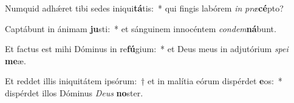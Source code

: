 \item Numquid adhǽret tibi sedes iniqui\textbf{tá}tis:~* qui fingis labórem \textit{in} \textit{præ}\textbf{cé}pto?
\item Captábunt in ánimam \textbf{ju}sti:~* et sánguinem innocéntem \textit{condem}\textbf{ná}bunt.
\item Et factus est mihi Dóminus in re\textbf{fú}gium:~* et Deus meus in adjutórium \textit{spei} \textbf{me}æ.
\item Et reddet illis iniquitátem i\-psórum:~† et in malítia eórum dispérdet \textbf{e}os:~* dispérdet illos Dóminus \textit{Deus} \textbf{no}ster.
